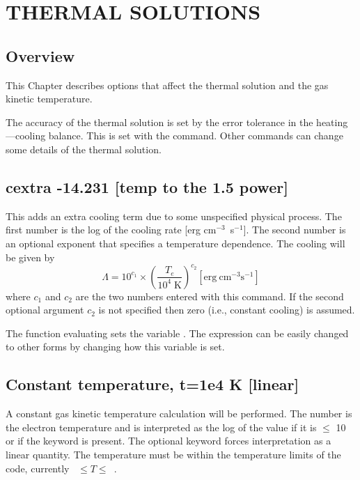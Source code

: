 \chapter{THERMAL SOLUTIONS}

\section{Overview}

This Chapter describes options that affect the thermal solution and the
gas kinetic temperature.

The accuracy of the thermal solution is set by the error tolerance in
the heating---cooling balance.
This is set with the  command.
Other commands can change some details of the thermal solution.

\section{cextra -14.231 [temp to the 1.5 power]}

This adds an extra cooling term due to some unspecified physical process.
The first number is the log of the cooling rate [erg cm$^{-3}$~s$^{-1}$].  The second
number is an optional exponent that specifies a temperature dependence.
The cooling will be given by
\begin{equation}
\Lambda  = 10^{c_1 }  \times \left( {\frac{{T_e }}{{10^4 \;{\mathrm{K}}}}}
\right)^{c_2 }
[\mathrm{erg\ cm}^{-3} \mathrm{s}^{-1}]%
\end{equation}
where $c_1$ and $c_2$ are the two numbers entered with this command. If the second
optional argument $c_2$ is not specified then zero
(i.e., constant cooling) is assumed.

The function evaluating  sets the
variable .
The expression can be easily changed to other forms by changing
how this variable is set.

\section{Constant temperature, t=1e4 K [linear]}

A constant gas kinetic temperature calculation will be performed.
The number
is the electron temperature and is interpreted
as the log
of the value if it is $\le$ 10 or if the keyword  is present.
The optional keyword  forces
interpretation as a linear quantity.
The temperature must be within the temperature limits
of the code, currently \TempLimitLow~$\leq T \leq$~\TempLimitHigh.

